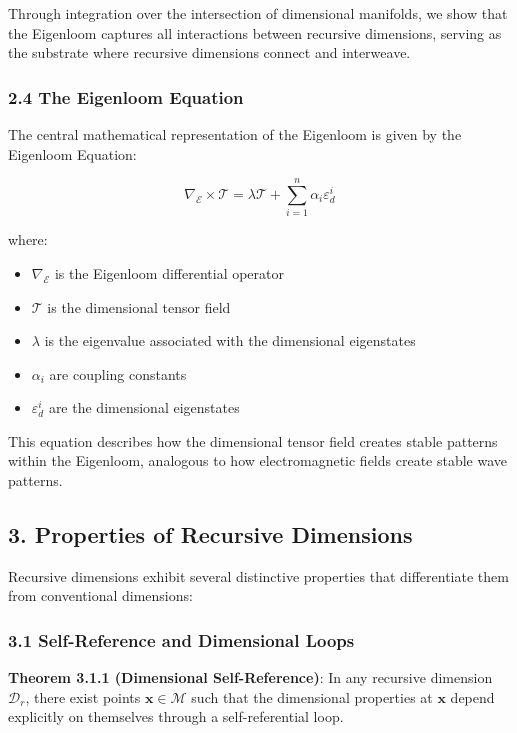 \documentclass[
]{article}
\providecommand{\tightlist}{%
  \setlength{\itemsep}{0pt}\setlength{\parskip}{0pt}}
\begin{document}
Through integration over the intersection of dimensional manifolds, we
show that the Eigenloom captures all interactions between recursive
dimensions, serving as the substrate where recursive dimensions connect
and interweave.

\subsubsection{2.4 The Eigenloom Equation}\label{the-eigenloom-equation}

The central mathematical representation of the Eigenloom is given by the
Eigenloom Equation:

\[\nabla_{\mathcal{E}} \times \mathcal{T} = \lambda \mathcal{T} + \sum_{i=1}^{n} \alpha_i \varepsilon_d^i\]

where:

\begin{itemize}
\tightlist
\item
  \(\nabla_{\mathcal{E}}\) is the Eigenloom differential operator
\item
  \(\mathcal{T}\) is the dimensional tensor field
\item
  \(\lambda\) is the eigenvalue associated with the dimensional
  eigenstates
\item
  \(\alpha_i\) are coupling constants
\item
  \(\varepsilon_d^i\) are the dimensional eigenstates
\end{itemize}

This equation describes how the dimensional tensor field creates stable
patterns within the Eigenloom, analogous to how electromagnetic fields
create stable wave patterns.

\subsection{3. Properties of Recursive
Dimensions}\label{properties-of-recursive-dimensions}

Recursive dimensions exhibit several distinctive properties that
differentiate them from conventional dimensions:

\subsubsection{3.1 Self-Reference and Dimensional
Loops}\label{self-reference-and-dimensional-loops}

\textbf{Theorem 3.1.1 (Dimensional Self-Reference)}: In any recursive
dimension \(\mathcal{D}_r\), there exist points
\(\mathbf{x} \in \mathcal{M}\) such that the dimensional properties at
\(\mathbf{x}\) depend explicitly on themselves through a
self-referential loop.
\end{document}

